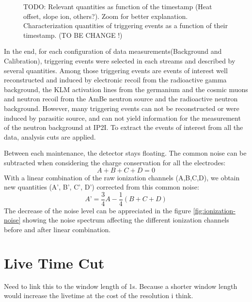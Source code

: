 \begin{figure}
\centering
\caption{TODO: Relevant quantities as function of the timestamp (Heat offset, slope ion, others?). Zoom for better explanation. Characterization quantities of triggering events as a function of their timestamp. (TO BE CHANGE !)}
\label{fig:analysis-monitoring-demo}
\end{figure}

In the end, for each configuration of data measurements(Background and Calibration), triggering events were selected in each streams and described by several quantities.
Among those triggering events are events of interest well reconstructed and induced by electronic recoil from the radioactive gamma background, the KLM activation lines from the germanium and the cosmic muons and neutron recoil from the AmBe neutron source and the radioactive neutron background. However, many triggering events can not be reconstructed or were induced by parasitic source, and can not yield information for the measurement of the neutron background at IP2I. To extract the events of interest from all the data, analysis cuts are applied.

Between each maintenance, the detector stays floating. The common noise can be subtracted when considering the charge conservation for all the electrodes:
\begin{equation}
\label{eq:charge-conservation}
A + B + C + D = 0
\end{equation}
With a linear combination of the raw ionization channels (A,B,C,D), we obtain new quantities (A’, B’, C’, D’) corrected from this common noise:
\begin{equation}
\label{eq:common-noise-subtraction}
A’ = \frac{3}{4} A - \frac{1}{4} \left( B + C + D \right)
\end{equation} 
The decrease of the noise level can be appreciated in the figure \ref{fig:ionization-noise} showing the noise spectrum affecting the different ionization channels before and after linear combination.


\section{Live Time Cut}


{\color{red} Need to link this to the window length of 1s. Because a shorter window length would increase the livetime at the cost of the resolution i think.}

